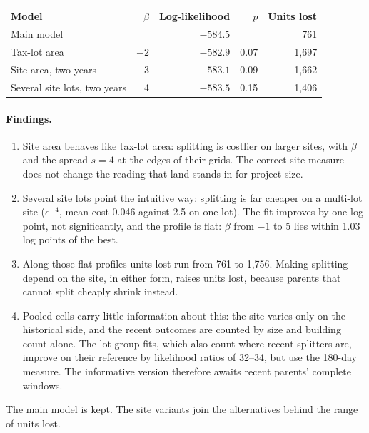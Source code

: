 \begin{center}
\small
\begin{tabular}{lrrrr}
\hline
Model & $\beta$ & Log-likelihood & $p$ & Units lost \\
\hline
Main model & & $-584.5$ & & 761 \\
Tax-lot area & $-2$ & $-582.9$ & 0.07 & 1,697 \\
Site area, two years & $-3$ & $-583.1$ & 0.09 & 1,662 \\
Several site lots, two years & 4 & $-583.5$ & 0.15 & 1,406 \\
\hline
\end{tabular}
\end{center}

\paragraph{Findings.}
\begin{enumerate}
\item Site area behaves like tax-lot area: splitting is costlier on larger
sites, with $\beta$ and the spread $s = 4$ at the edges of their grids. The
correct site measure does not change the reading that land stands in for
project size.
\item Several site lots point the intuitive way: splitting is far cheaper on a
multi-lot site ($e^{-4}$, mean cost 0.046 against 2.5 on one lot). The fit
improves by one log point, not significantly, and the profile is flat: $\beta$
from $-1$ to 5 lies within 1.03 log points of the best.
\item Along those flat profiles units lost run from 761 to 1,756. Making
splitting depend on the site, in either form, raises units lost, because
parents that cannot split cheaply shrink instead.
\item Pooled cells carry little information about this: the site varies only
on the historical side, and the recent outcomes are counted by size and
building count alone. The lot-group fits, which also count where recent
splitters are, improve on their reference by likelihood ratios of 32--34, but
use the 180-day measure. The informative version therefore awaits recent
parents' complete windows.
\end{enumerate}

The main model is kept. The site variants join the alternatives behind the
range of units lost.
